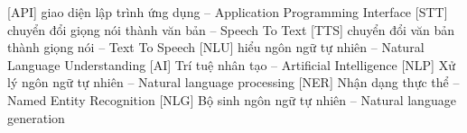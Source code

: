  [API]   {giao diện lập trình ứng dụng -- Application Programming Interface}
 [STT]   {chuyển đổi giọng nói thành văn bản -- Speech To Text}
 [TTS]   {chuyển đổi văn bản thành giọng nói -- Text To Speech}
 [NLU]   {hiểu ngôn ngữ tự nhiên -- Natural Language Understanding}
  [AI]    {Trí tuệ nhân tạo -- Artificial Intelligence}
 [NLP]    {Xử lý ngôn ngữ tự nhiên -- Natural language processing}
 [NER]    {Nhận dạng thực thể -- Named Entity Recognition}
 [NLG]    {Bộ sinh ngôn ngữ tự nhiên -- Natural language generation}
